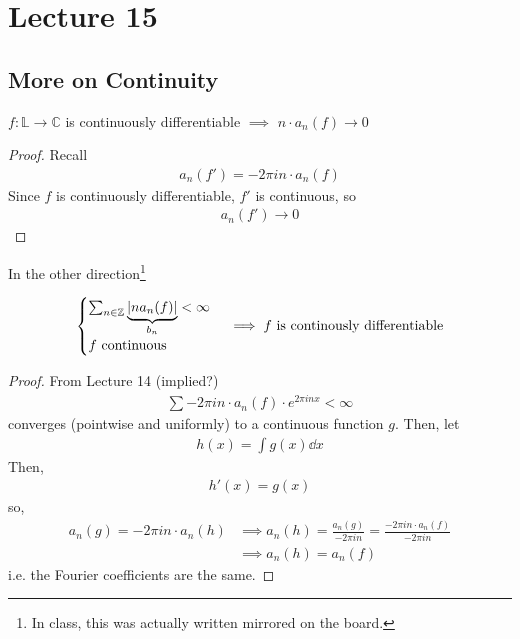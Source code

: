 \section{Lecture 15}
\subsection{More on Continuity}
\begin{lemma}
    $f: \mathbb{L} \to \mathbb{C}$ is continuously differentiable $\implies$ $n \cdot a_n(f) \to 0$
\end{lemma}
\begin{proof}
    Recall
    \begin{align}
        a_n(f') = -2\pi in \cdot a_n(f)
    \end{align}
    Since $f$ is continuously differentiable, $f'$ is continuous, so
    \begin{align}
        a_n(f') \to 0
    \end{align}
\end{proof}
In the other direction\footnote{In class, this was actually written mirrored on the board.}
\begin{lemma}
    \begin{align}
        \begin{cases}
            \sum_{n \in \mathbb{Z}} \underbrace{\abs{n a_n(f)}}_{b_n} < \infty\\
            f\text{ continuous}
        \end{cases} \implies f \text{ is continously differentiable}
    \end{align}
\end{lemma}
\begin{proof}
    From Lecture 14 (implied?)
    \begin{align}
        \sum -2\pi in \cdot a_n(f) \cdot e^{2\pi in x} < \infty
    \end{align}
    converges (pointwise and uniformly) to a continuous function $g$. Then, let
    \begin{align}
        h(x) = \int g(x) \dd{x}
    \end{align}
    Then,
    \begin{align}
        h'(x) = g(x)
    \end{align}
    so,
    \begin{align}
        a_n(g) = -2\pi in \cdot a_n(h) &\implies a_n(h) = \frac{a_n(g)}{-2\pi in} = \frac{-2\pi in \cdot a_n(f)}{-2\pi in}\\
        &\implies a_n(h) = a_n(f)
    \end{align}
    i.e. the Fourier coefficients are the same.
\end{proof}
